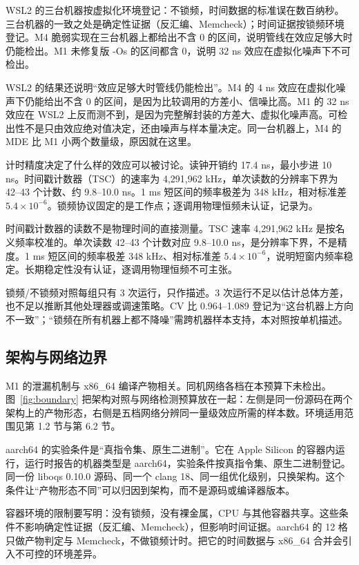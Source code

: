 WSL2 的三台机器按虚拟化环境登记：不锁频，时间数据的标准误在数百纳秒。三台机器的一致之处是确定性证据（反汇编、Memcheck）；时间证据按锁频环境登记。M4 脆弱实现在三台机器上都给出不含 0 的区间，说明管线在效应足够大时仍能检出。M1 未修复版 -Os 的区间都含 0，说明 32 ns 效应在虚拟化噪声下不可检出。

WSL2 的结果还说明“效应足够大时管线仍能检出”。M4 的 4 ns 效应在虚拟化噪声下仍能给出不含 0 的区间，是因为比较调用的方差小、信噪比高。M1 的 32 ns 效应在 WSL2 上反而测不到，是因为完整解封装的方差大、虚拟化噪声高。可检出性不是只由效应绝对值决定，还由噪声与样本量决定。同一台机器上，M4 的 MDE 比 M1 小两个数量级，原因就在这里。

计时精度决定了什么样的效应可以被讨论。读钟开销约 17.4 ns，最小步进 10 ns。时间戳计数器（TSC）的速率为 4,291,962 kHz，单次读数的分辨率下界为 42--43 个计数、约 9.8--10.0 ns。1 ms 短区间的频率极差为 348 kHz，相对标准差 $5.4\times10^{-6}$。锁频协议固定的是工作点；逐调用物理恒频未认证，记录为。%

时间戳计数器的读数不是物理时间的直接测量。TSC 速率 4,291,962 kHz 是按名义频率校准的。单次读数 42--43 个计数对应 9.8--10.0 ns，是分辨率下界，不是精度。1 ms 短区间的频率极差 348 kHz、相对标准差 $5.4\times10^{-6}$，说明短窗内频率稳定。长期稳定性没有认证，逐调用物理恒频不可主张。

锁频/不锁频对照每组只有 3 次运行，只作描述。3 次运行不足以估计总体方差，也不足以推断其他处理器或调速策略。CV 比 0.964--1.089 登记为“这台机器上方向不一致”；“锁频在所有机器上都不降噪”需跨机器样本支持，本对照按单机描述。



\subsection{架构与网络边界}

M1 的泄漏机制与 x86\_64 编译产物相关。同机网络各档在本预算下未检出。图~\ref{fig:boundary} 把架构对照与网络检测预算放在一起：左侧是同一份源码在两个架构上的产物形态，右侧是五档网络分辨同一量级效应所需的样本数。环境适用范围见第 1.2 节与第 6.2 节。%

aarch64 的实验条件是“真指令集、原生二进制”。它在 Apple Silicon 的容器内运行，运行时报告的机器类型是 aarch64，实验条件按真指令集、原生二进制登记。同一份 liboqs 0.10.0 源码、同一个 clang 18、同一组优化级别，只换架构。这个条件让“产物形态不同”可以归因到架构，而不是源码或编译器版本。

容器环境的限制要写明：没有锁频，没有裸金属，CPU 与其他容器共享。这些条件不影响确定性证据（反汇编、Memcheck），但影响时间证据。aarch64 的 12 格只做产物判定与 Memcheck，不做锁频计时。把它的时间数据与 x86\_64 合并会引入不可控的环境差异。

